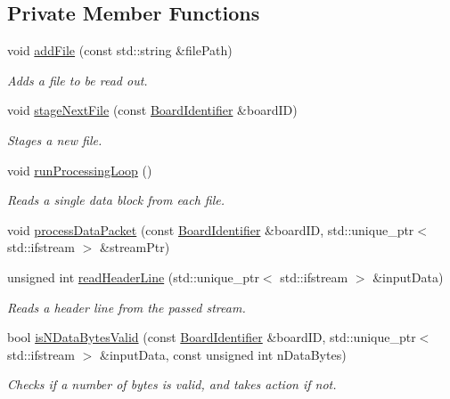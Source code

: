 \subsection*{Private Member Functions}
\begin{DoxyCompactItemize}
\item 
void \hyperlink{class_file_reader_a3404694daef538fdd001a3e2ae898fb8}{add\+File} (const std\+::string \&file\+Path)
\begin{DoxyCompactList}\small\item\em Adds a file to be read out. \end{DoxyCompactList}\item 
void \hyperlink{class_file_reader_ad4d5d927c5d9ceb26bba7ec1f6c60737}{stage\+Next\+File} (const \hyperlink{class_board_identifier}{Board\+Identifier} \&board\+ID)
\begin{DoxyCompactList}\small\item\em Stages a new file. \end{DoxyCompactList}\item 
void \hyperlink{class_file_reader_a98606ec7d315f1ed6f90c531df0d09f9}{run\+Processing\+Loop} ()
\begin{DoxyCompactList}\small\item\em Reads a single data block from each file. \end{DoxyCompactList}\item 
void \hyperlink{class_file_reader_afefd5cfc826ebefa7d5ab06d6d967149}{process\+Data\+Packet} (const \hyperlink{class_board_identifier}{Board\+Identifier} \&board\+ID, std\+::unique\+\_\+ptr$<$ std\+::ifstream $>$ \&stream\+Ptr)
\item 
unsigned int \hyperlink{class_file_reader_a94181d78b29ebacf2a4b3b3cd03a6750}{read\+Header\+Line} (std\+::unique\+\_\+ptr$<$ std\+::ifstream $>$ \&input\+Data)
\begin{DoxyCompactList}\small\item\em Reads a header line from the passed stream. \end{DoxyCompactList}\item 
bool \hyperlink{class_file_reader_ae0a796cb06ebe3e486795dea8da0f6bc}{is\+N\+Data\+Bytes\+Valid} (const \hyperlink{class_board_identifier}{Board\+Identifier} \&board\+ID, std\+::unique\+\_\+ptr$<$ std\+::ifstream $>$ \&input\+Data, const unsigned int n\+Data\+Bytes)
\begin{DoxyCompactList}\small\item\em Checks if a number of bytes is valid, and takes action if not. \end{DoxyCompactList}\item 

\end{DoxyCompactItemize}
